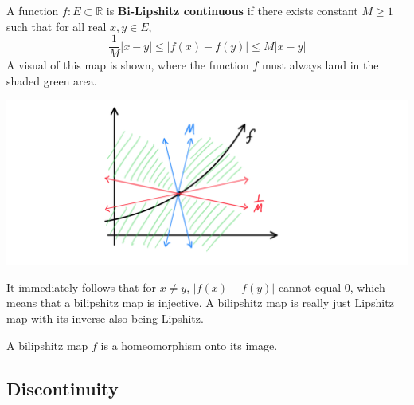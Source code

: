   \begin{definition}
    A function $f: E \subset \mathbb{R}$ is \textbf{Bi-Lipshitz continuous} if there exists constant $M\geq 1$ such that for all real $x, y \in E$, 
    \[ \frac{1}{M} |x - y| \leq |f(x) - f(y)| \leq M |x - y|\]
    A visual of this map is shown, where the function $f$ must always land in the shaded green area. 
    \begin{center}
        \includegraphics[scale=0.25]{img/BiLipshitz_Map.PNG}
    \end{center}
    It immediately follows that for $x \neq y$, $ |f(x) - f(y)|$ cannot equal $0$, which means that a bilipshitz map is injective. A bilipshitz map is really just Lipshitz map with its inverse also being Lipshitz. 
  \end{definition}

  \begin{proposition}
  A bilipshitz map $f$ is a homeomorphism onto its image. 
  \end{proposition}

\subsection{Discontinuity}

